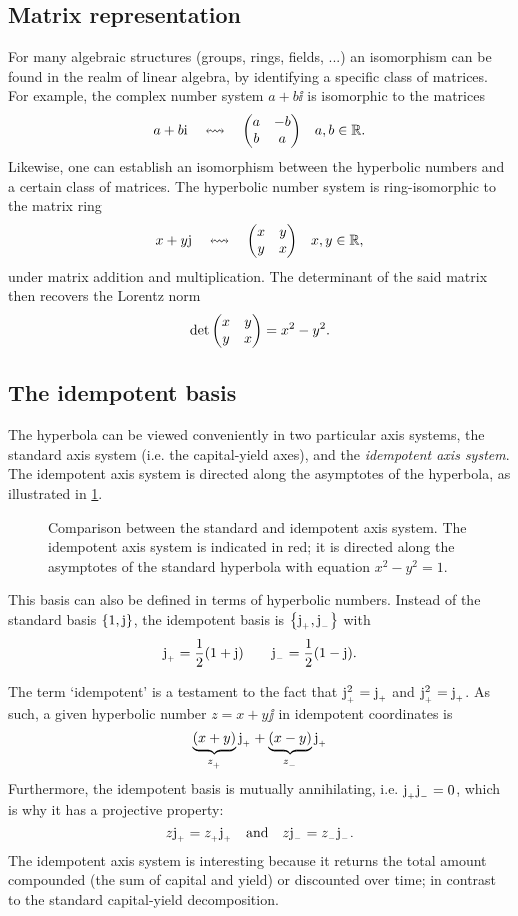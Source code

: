 \subsection{Matrix representation}
For many algebraic structures (groups, rings, fields, ...) an isomorphism can be found in the realm of linear algebra, by identifying a specific class of matrices. For example, the complex number system \(a + b\ii\) is isomorphic to the matrices
\[
     a + b\ii \corresponds \mqty(a & -b \\ b & a) \quad a, b \in \real.
\]
Likewise, one can establish an isomorphism between the hyperbolic numbers and a certain class of matrices. The hyperbolic number system is ring-isomorphic to the matrix ring
\[
     x + y\jj \corresponds \mqty(x & y \\ y & x) \quad x, y \in \real,
\]
under matrix addition and multiplication. The determinant of the said matrix then recovers the Lorentz norm
\[
     \det \mqty(x & y \\ y & x) = x^2 - y^2.
\]

\subsection{The idempotent basis}
The hyperbola can be viewed conveniently in two particular axis systems, the standard axis system (i.e. the capital-yield axes), and the \emph{idempotent axis system}. The idempotent axis system is directed along the asymptotes of the hyperbola, as illustrated in \cref{fig:hyperbola_comparison}.
\begin{figure}[h!]
    \centering
    
    \caption{Comparison between the standard and idempotent axis system. The idempotent axis system is indicated in red; it is directed along the asymptotes of the standard hyperbola with equation $x^2 - y^2 = 1$.}
    \label{fig:hyperbola_comparison}
\end{figure}

This basis can also be defined in terms of hyperbolic numbers. Instead of the standard basis \(\qty{1, \ensuremath{\mathrm{j}}}\), the idempotent basis is \(\qty{\ensuremath{\mathrm{j}_{_+}}, \ensuremath{\mathrm{j}_{_-}}}\) with 
\[
     \mathrm{j}_{_+} = \frac{1}{2}(1 + \mathrm{j}) \qquad \mathrm{j}_{_-} = \frac{1}{2}(1 - \mathrm{j}).
\]

The term `idempotent' is a testament to the fact that \(\mathrm{j}_{_+}^2 = \mathrm{j}_{_+}\) and \(\mathrm{j}_{_+}^2 = \mathrm{j}_{_+}\). As such, a given hyperbolic number \(z = x + y\jj\) in idempotent coordinates is 
\[
     \underbrace{\qty(x + y)}_{z_{_+}}\mathrm{j}_{_+} + \underbrace{\qty(x - y)}_{z_{_-}}\mathrm{j}_{_+}
\]
Furthermore, the idempotent basis is mutually annihilating, i.e. \(\mathrm{j}_{_+} \mathrm{j}_{_-} = 0\), which is why it has a projective property: \cite{Sobczyk1995}
\[
     z\mathrm{j}_{_+} = z_{_+}\mathrm{j}_{_+}\quad\text{and}\quad z\mathrm{j}_{_-} = z_{_-}\mathrm{j}_{_-}.
\]
The idempotent axis system is interesting because it returns the total amount compounded (the sum of capital and yield) or discounted over time; in contrast to the standard capital-yield decomposition.

